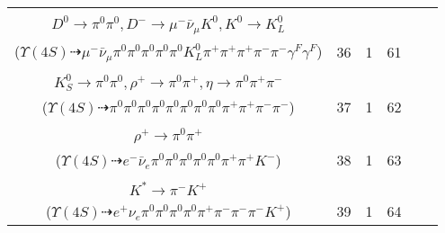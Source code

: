 \documentclass[landscape]{article}
\newcounter{rownumbers}
\newcommand\rn{\stepcounter{rownumbers}\arabic{rownumbers}}
\newcommand{\EOLP}{\\ \hline} %
\newcommand{\topoTags}[1]{#1} %
\begin{document}
\begin{longtable}{clcccc}
\rn & \makecell[l]{ $ 
\Upsilon(4S) \rightarrow B^{0} \bar{B}^{0} ,
B^{0} \rightarrow \rho^{0} \pi^{+} \omega D^{*-} ,
\bar{B}^{0} \rightarrow \pi^{0} D^{0} ,
\rho^{0} \rightarrow \pi^{+} \pi^{-} ,
\omega \rightarrow \pi^{0} \pi^{+} \pi^{-} \gamma^{F} \gamma^{F} ,
D^{*-} \rightarrow \pi^{0} D^{-} ,
$ \\ $
D^{0} \rightarrow \pi^{0} \pi^{0} ,
D^{-} \rightarrow \mu^{-} \bar{\nu}_{\mu} K^{0} ,
K^{0} \rightarrow K_{L}^{0} 
$ \\ ($
\Upsilon(4S) \dashrightarrow \mu^{-} \bar{\nu}_{\mu} \pi^{0} \pi^{0} \pi^{0} \pi^{0} \pi^{0} K_{L}^{0} \pi^{+} \pi^{+} \pi^{+} \pi^{-} \pi^{-} \gamma^{F} \gamma^{F} 
$) } & \topoTags{36 & }1 & 61 \EOLP

\rn & \makecell[l]{ $ 
\Upsilon(4S) \rightarrow B^{0} \bar{B}^{0} ,
B^{0} \rightarrow K^{0} J/\psi ,
\bar{B}^{0} \rightarrow \pi^{0} D^{0} ,
K^{0} \rightarrow K_{S}^{0} ,
J/\psi \rightarrow \pi^{0} \pi^{-} \rho^{+} \eta ,
D^{0} \rightarrow \pi^{0} \pi^{0} ,
$ \\ $
K_{S}^{0} \rightarrow \pi^{0} \pi^{0} ,
\rho^{+} \rightarrow \pi^{0} \pi^{+} ,
\eta \rightarrow \pi^{0} \pi^{+} \pi^{-} 
$ \\ ($
\Upsilon(4S) \dashrightarrow \pi^{0} \pi^{0} \pi^{0} \pi^{0} \pi^{0} \pi^{0} \pi^{0} \pi^{0} \pi^{+} \pi^{+} \pi^{-} \pi^{-} 
$) } & \topoTags{37 & }1 & 62 \EOLP

\rn & \makecell[l]{ $ 
\Upsilon(4S) \rightarrow B^{0} \bar{B}^{0} ,
B^{0} \rightarrow \pi^{0} \bar{D}^{0} ,
\bar{B}^{0} \rightarrow e^{-} \bar{\nu}_{e} D^{*+} ,
\bar{D}^{0} \rightarrow \pi^{0} \pi^{0} ,
D^{*+} \rightarrow \pi^{0} D^{+} ,
D^{+} \rightarrow \pi^{+} \rho^{+} K^{-} ,
$ \\ $
\rho^{+} \rightarrow \pi^{0} \pi^{+} 
$ \\ ($
\Upsilon(4S) \dashrightarrow e^{-} \bar{\nu}_{e} \pi^{0} \pi^{0} \pi^{0} \pi^{0} \pi^{0} \pi^{+} \pi^{+} K^{-} 
$) } & \topoTags{38 & }1 & 63 \EOLP

\rn & \makecell[l]{ $ 
\Upsilon(4S) \rightarrow B^{0} \bar{B}^{0} ,
B^{0} \rightarrow e^{+} \nu_{e} D^{*-} ,
\bar{B}^{0} \rightarrow \pi^{0} D^{0} ,
D^{*-} \rightarrow \pi^{-} \bar{D}^{0} ,
D^{0} \rightarrow \pi^{0} \pi^{0} ,
\bar{D}^{0} \rightarrow \pi^{0} \pi^{+} \pi^{-} K^{*} ,
$ \\ $
K^{*} \rightarrow \pi^{-} K^{+} 
$ \\ ($
\Upsilon(4S) \dashrightarrow e^{+} \nu_{e} \pi^{0} \pi^{0} \pi^{0} \pi^{0} \pi^{+} \pi^{-} \pi^{-} \pi^{-} K^{+} 
$) } & \topoTags{39 & }1 & 64 \EOLP


\end{longtable}
\end{document}
